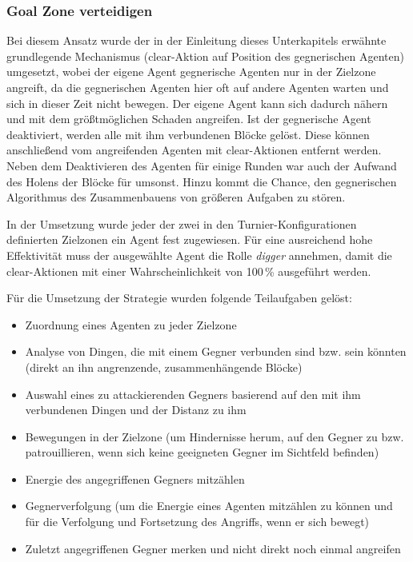 \documentclass[runningheads]{llncs}
\begin{document}
\subsubsection{Goal Zone verteidigen}
Bei diesem Ansatz wurde der in der Einleitung dieses Unterkapitels erwähnte grundlegende Mechanismus (clear-Aktion auf Position des gegnerischen Agenten) umgesetzt, wobei der eigene Agent gegnerische Agenten nur in der Zielzone angreift, da die gegnerischen Agenten hier oft auf andere Agenten warten und sich in dieser Zeit nicht bewegen. Der eigene Agent kann sich dadurch nähern und mit dem größtmöglichen Schaden angreifen. Ist der gegnerische Agent deaktiviert, werden alle mit ihm verbundenen Blöcke gelöst. Diese können anschließend vom angreifenden Agenten mit clear-Aktionen entfernt werden. Neben dem Deaktivieren des Agenten für einige Runden war auch der Aufwand des Holens der Blöcke für umsonst. Hinzu kommt die Chance, den gegnerischen Algorithmus des Zusammenbauens von größeren Aufgaben zu stören.

In der Umsetzung wurde jeder der zwei in den Turnier-Konfigurationen definierten Zielzonen ein Agent fest zugewiesen. Für eine ausreichend hohe Effektivität muss der ausgewählte Agent die Rolle \textit{digger} annehmen, damit die clear-Aktionen mit einer Wahrscheinlichkeit von 100\,\% ausgeführt werden.

Für die Umsetzung der Strategie wurden folgende Teilaufgaben gelöst:
\begin{itemize}
\item{Zuordnung eines Agenten zu jeder Zielzone}
\item{Analyse von Dingen, die mit einem Gegner verbunden sind bzw. sein könnten (direkt an ihn angrenzende, zusammenhängende Blöcke)}
\item{Auswahl eines zu attackierenden Gegners basierend auf den mit ihm verbundenen Dingen und der Distanz zu ihm}
\item{Bewegungen in der Zielzone (um Hindernisse herum, auf den Gegner zu bzw. patrouillieren, wenn sich keine geeigneten Gegner im Sichtfeld befinden)}
\item{Energie des angegriffenen Gegners mitzählen}
\item{Gegnerverfolgung (um die Energie eines Agenten mitzählen zu können und für die Verfolgung und Fortsetzung des Angriffs, wenn er sich bewegt)}
\item{Zuletzt angegriffenen Gegner merken und nicht direkt noch einmal angreifen}
\end{itemize}
\end{document}

